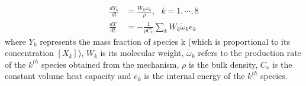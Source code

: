 \begin{equation}
\label{aHm:eqn5}
\begin{split}
\frac{dY_k}{dt} &= \frac{W_k \dot{\omega}_k}{\rho},~~~k=1,\cdots,8 \\
\frac{dT}{dt} &= -\frac{1}{\rho C_v} \sum_k{W_k \dot{\omega}_ke_k}
\end{split}
\end{equation}
where $Y_k$ represents the mass fraction of species k (which is proportional to its concentration $\left[ X_k\right]$), $W_k$ is its molecular weight, $\dot{\omega}_k$ refers to the production rate of the $k^{th}$ species obtained from the mechanism, $\rho$ is the bulk density, $C_v$ is the constant volume heat capacity and $e_k$ is the internal energy of the $k^{th}$ species.

\begin{table}[htb]
    \caption[Rate coefficients and uncertainty ranges of H$_2$-O$_2$ system]{Rate coefficients and uncertainty ranges of H$_2$-O$_2$ system. \cite{tsang1986chemical,tsang1992chemical,baulch1994evaluated,baulch2005evaluated,pilling2009elementary,saltelli2005sensitivity,baulch1994summary,tomlin2013role}}
    \begin{center}
\end{center}
\end{table}
